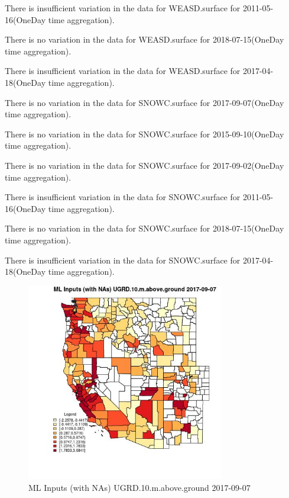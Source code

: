 There is insufficient variation in the data for WEASD.surface for 2011-05-16(OneDay time aggregation). 
 

There is no variation in the data for WEASD.surface for 2018-07-15(OneDay time aggregation). 
 

There is insufficient variation in the data for WEASD.surface for 2017-04-18(OneDay time aggregation). 
 

There is no variation in the data for SNOWC.surface for 2017-09-07(OneDay time aggregation). 
 

There is no variation in the data for SNOWC.surface for 2015-09-10(OneDay time aggregation). 
 

There is no variation in the data for SNOWC.surface for 2017-09-02(OneDay time aggregation). 
 

There is insufficient variation in the data for SNOWC.surface for 2011-05-16(OneDay time aggregation). 
 

There is no variation in the data for SNOWC.surface for 2018-07-15(OneDay time aggregation). 
 

There is insufficient variation in the data for SNOWC.surface for 2017-04-18(OneDay time aggregation). 
 

\begin{figure} 
\centering  
\includegraphics[width=0.77\textwidth]{Code_Outputs/Report_ML_input_PM25_Step4_part_e_de_duplicated_aves_compiled_2019-05-21wNAs_CountyUGRD10mabovegroundMean2017-09-07.jpg} 
\caption{\label{fig:Report_ML_input_PM25_Step4_part_e_de_duplicated_aves_compiled_2019-05-21wNAsCountyUGRD10mabovegroundMean2017-09-07}ML Inputs (with NAs) UGRD.10.m.above.ground 2017-09-07} 
\end{figure} 
 

